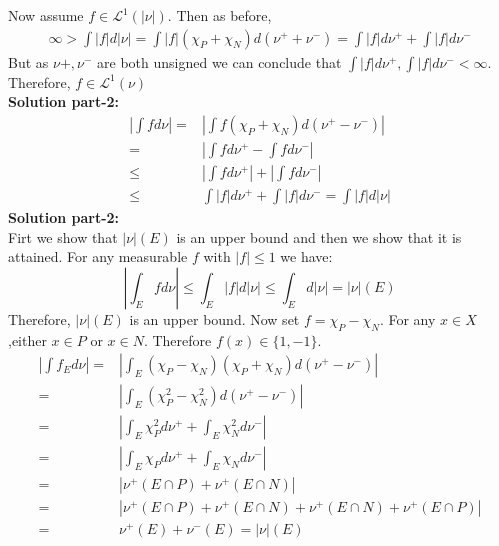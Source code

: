 \documentclass[notoc]{tufte-book}
\begin{document}
Now assume $f\in\mathcal L^1(|\nu|)$. Then as before,
\begin{align}
	\infty>\int|f|d|\nu|=\int|f|(\chi_P+\chi_N)d(\nu^++\nu^-)=\int|f|d\nu^++\int|f|d\nu^-
\end{align}
But as $\nu+,\nu^-$ are both unsigned we can conclude that $\int|f|d\nu^+,\int|f|d\nu^-<\infty$. Therefore, $f\in\mathcal L^1(\nu)$\\
\textbf{Solution part-2:}\\
\begin{align*}
	\left|\int fd\nu\right|=&\left|\int f(\chi_P+\chi_N)d(\nu^+-\nu^-)\right|\\
	=&\left|\int f d\nu^+-\int f d\nu^- \right|\\
	\leq&\left|\int f d\nu^+\right|+\left|\int f d\nu^- \right|\\
	\leq&\int |f| d\nu^++\int |f| d\nu^-=\int|f|d|\nu|
\end{align*}
\textbf{Solution part-2:}\\
Firt we show that $|\nu|(E)$ is an upper bound and then we show that it is attained. For any measurable $f$ with $|f|\leq1$ we have:
$$\left|\int_Efd\nu\right|\leq \int_E|f|d|\nu|\leq \int_Ed|\nu|=|\nu|(E)$$
Therefore, $|\nu|(E)$ is an upper bound. Now set $f=\chi_P-\chi_N$. For any $x\in X$,either  $x\in P$ or $x\in N$. Therefore $f(x)\in\{1,-1\}$.  
\begin{align*}
	\left|\int f_Ed\nu\right|=&\left|\int_E (\chi_P-\chi_N)(\chi_P+\chi_N)d(\nu^+-\nu^-)\right|\\
	=&\left|\int_E(\chi_P^2-\chi_N^2)d(\nu^+-\nu^-)\right|\\
	=&\left|\int_E\chi_P^2d\nu^++\int_E\chi_N^2d\nu^-\right|\\
	=&\left|\int_E\chi_Pd\nu^++\int_E\chi_Nd\nu^-\right|\\
	=&|\nu^+(E\cap P)+\nu^+(E\cap N)|\\
	=&|\nu^+(E\cap P)+\nu^+(E\cap N)+\nu^+(E\cap N)+\nu^+(E\cap P)|\\
	=&\nu^+(E)+\nu^-(E)=|\nu|(E)
\end{align*}

\backmatter





\printindex
\end{document}

